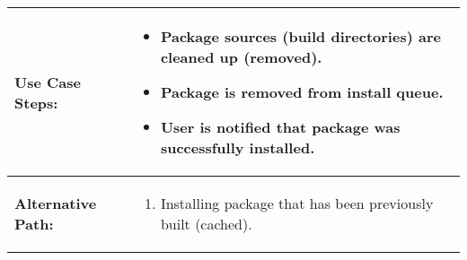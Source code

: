 \begin{tabularx}{\linewidth}{|l|X|}
\hline
\textbf{Use Case Steps:} & 
\begin{minipage}{\linewidth}
  \vspace{0.05em}
  \begin{itemize}
    \item Package sources (build directories) are cleaned up (removed).
    \item Package is removed from install queue.
    \item User is notified that package was successfully installed.
  \end{itemize}
  \vspace{0.05em}
\end{minipage}
\\
\hline 
\textbf{Alternative Path:} &
\begin{minipage}{\linewidth}
  \vspace{0.05em} 
  \begin{enumerate}
    \item Installing package that has been previously built (cached).
  \end{enumerate}
  \vspace{0.05em} 
\end{minipage}
\\
\hline
\end{tabularx}

\newpage


